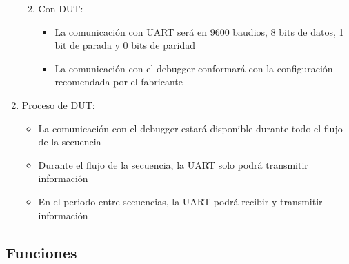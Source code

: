 \documentclass[
11pt, %
]{charter}
\begin{document}
\begin{enumerate}
\begin{enumerate}
\begin{itemize}
\begin{itemize}
			\end{itemize}
		\end{itemize}
		\item Con DUT:
		\begin{itemize}
			\item La comunicación con UART será en 9600 baudios, 8 bits de datos, 1 bit de parada y 0 bits de paridad
			\item La comunicación con el debugger conformará con la configuración recomendada por el fabricante
		\end{itemize}
	\end{enumerate}
	\item Proceso de DUT:
	\begin{itemize}
		\item La comunicación con el debugger estará disponible durante todo el flujo de la secuencia
		\item Durante el flujo de la secuencia, la UART solo podrá transmitir información
		\item En el periodo entre secuencias, la UART podrá recibir y transmitir información
	\end{itemize}
\end{enumerate}

\subsection{Funciones}
\label{sub:funciones}
\end{document}

